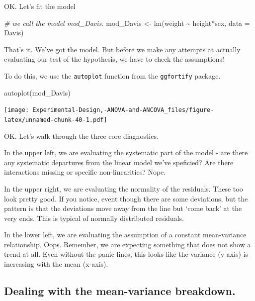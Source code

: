 \documentclass[
]{book}
\newenvironment{Shaded}{\begin{snugshade}}{\end{snugshade}}
\newcommand{\AttributeTok}[1]{\textcolor[rgb]{0.77,0.63,0.00}{#1}}
\newcommand{\CommentTok}[1]{\textcolor[rgb]{0.56,0.35,0.01}{\textit{#1}}}
\newcommand{\FunctionTok}[1]{\textcolor[rgb]{0.00,0.00,0.00}{#1}}
\newcommand{\NormalTok}[1]{#1}
\newcommand{\OtherTok}[1]{\textcolor[rgb]{0.56,0.35,0.01}{#1}}
\newcommand{\SpecialCharTok}[1]{\textcolor[rgb]{0.00,0.00,0.00}{#1}}
\begin{document}
OK. Let's fit the model

\begin{Shaded}
\begin{Highlighting}[]
\CommentTok{\# we call the model mod\_Davis.}
\NormalTok{mod\_Davis }\OtherTok{\textless{}{-}} \FunctionTok{lm}\NormalTok{(weight }\SpecialCharTok{\textasciitilde{}}\NormalTok{ height}\SpecialCharTok{*}\NormalTok{sex, }\AttributeTok{data =}\NormalTok{ Davis)}
\end{Highlighting}
\end{Shaded}

That's it. We've got the model. But before we make any attempts at actually evaluating our test of the hypothesis, we have to check the assumptions!

To do this, we use the \texttt{autoplot} function from the \texttt{ggfortify} package.

\begin{Shaded}
\begin{Highlighting}[]
\FunctionTok{autoplot}\NormalTok{(mod\_Davis)}
\end{Highlighting}
\end{Shaded}

\texttt{[image: Experimental-Design,-ANOVA-and-ANCOVA\_files/figure-latex/unnamed-chunk-40-1.pdf]}

OK. Let's walk through the three core diagnostics.

In the upper left, we are evaluating the systematic part of the model - are there any systematic departures from the linear model we've speficied? Are there interactions missing or specific non-linearities? Nope.

In the upper right, we are evaluating the normality of the residuals. These too look pretty good. If you notice, event though there are some deviations, but the pattern is that the deviations move away from the line but `come back' at the very ends. This is typical of normally distributed residuals.

In the lower left, we are evaluating the assumption of a constant mean-variance relationship. Oops. Remember, we are expecting something that does not show a trend at all. Even without the panic lines, this looks like the variance (y-axis) is increasing with the mean (x-axis).

\hypertarget{dealing-with-the-mean-variance-breakdown.}{%
\subsection{Dealing with the mean-variance breakdown.}\label{dealing-with-the-mean-variance-breakdown.}}
\end{document}
